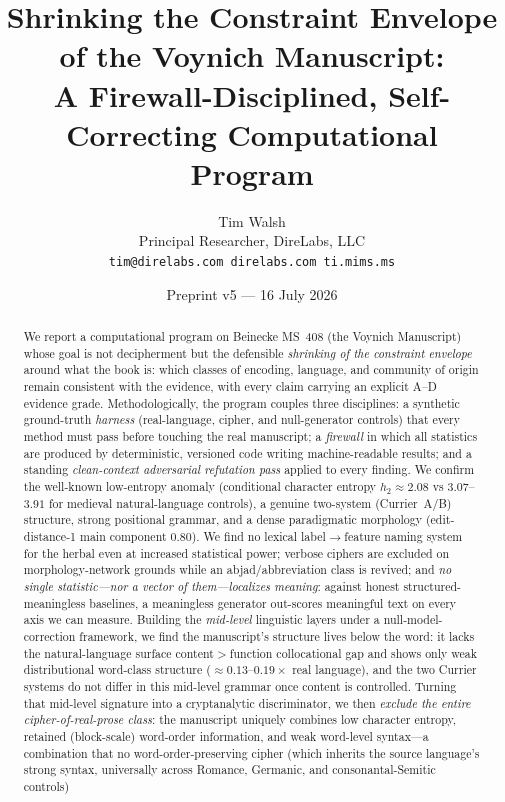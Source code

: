 \documentclass[11pt]{article}
\title{\textbf{Shrinking the Constraint Envelope of the Voynich Manuscript:\\
A Firewall-Disciplined, Self-Correcting Computational Program}}
\author{Tim Walsh \\ \small Principal Researcher, DireLabs, LLC \\
\small \texttt{tim@direlabs.com \quad direlabs.com \quad ti.mims.ms}}
\date{Preprint v5 --- 16 July 2026}
\begin{document}
\maketitle

\begin{abstract}
\noindent We report a computational program on Beinecke MS~408 (the Voynich
Manuscript) whose goal is not decipherment but the defensible \emph{shrinking of the
constraint envelope} around what the book is: which classes of encoding, language,
and community of origin remain consistent with the evidence, with every claim carrying
an explicit A--D evidence grade. Methodologically, the program couples three
disciplines: a synthetic ground-truth \emph{harness} (real-language, cipher, and
null-generator controls) that every method must pass before touching the real
manuscript; a \emph{firewall} in which all statistics are produced by deterministic,
versioned code writing machine-readable results; and a standing \emph{clean-context
adversarial refutation pass} applied to every finding. We confirm the well-known
low-entropy anomaly (conditional character entropy $h_2\approx 2.08$ vs
$3.07$--$3.91$ for medieval natural-language controls), a genuine two-system
(Currier~A/B) structure, strong positional grammar, and a dense paradigmatic
morphology (edit-distance-1 main component $0.80$). We find no lexical
label$\rightarrow$feature naming system for the herbal even at increased statistical
power; verbose ciphers are excluded on morphology-network grounds while an
abjad/abbreviation class is revived; and \emph{no single statistic---nor a vector of
them---localizes meaning}: against honest structured-meaningless baselines, a
meaningless generator out-scores meaningful text on every axis we can measure. Building
the \emph{mid-level} linguistic layers under a null-model-correction framework, we find
the manuscript's structure lives below the word: it lacks the natural-language surface
content$>$function collocational gap and shows only weak distributional word-class
structure ($\approx\!0.13$--$0.19\times$ real language), and the two Currier systems do
not differ in this mid-level grammar once content is controlled. Turning that mid-level
signature into a cryptanalytic discriminator, we then \emph{exclude the entire
cipher-of-real-prose class}: the manuscript uniquely combines low character entropy,
retained (block-scale) word-order information, and weak word-level syntax---a
combination that no word-order-preserving cipher (which inherits the source language's
strong syntax, universally across Romance, Germanic, and consonantal-Semitic controls)

\end{abstract}
\end{document}
